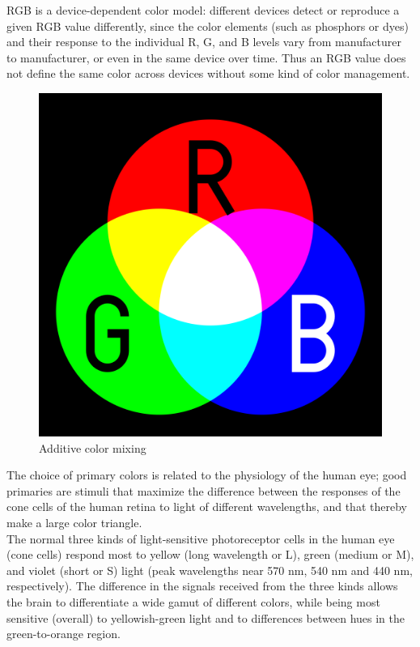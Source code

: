 \begin{itemize}
                \vspace{2mm}
                RGB is a device-dependent color model: different devices detect or reproduce a given RGB value differently, since the color elements (such as phosphors or dyes) 
                and their response to the individual R, G, and B levels vary from manufacturer to manufacturer, or even in the same device over time. Thus an RGB value does not define 
                the same color across devices without some kind of color management.
                \begin{figure}[H]
                    \centering
                    \includegraphics[width=0.6\linewidth]{img/RGB.png}
                    \caption{Additive color mixing}
                \end{figure}
                The choice of primary colors is related to the physiology of the human eye; good primaries are stimuli that maximize the difference between the responses of the cone 
                cells of the human retina to light of different wavelengths, and that thereby make a large color triangle. \\ 
                \vspace{2mm}
                The normal three kinds of light-sensitive photoreceptor cells in the human eye (cone cells) respond most to yellow (long wavelength or L), green (medium or M), 
                and violet (short or S) light (peak wavelengths near 570 nm, 540 nm and 440 nm, respectively). The difference in the signals received from the three kinds allows 
                the brain to differentiate a wide gamut of different colors, while being most sensitive (overall) to yellowish-green light and to differences between hues in the 
                green-to-orange region.
                \begin{figure}[H]

\end{figure}
\end{itemize}

